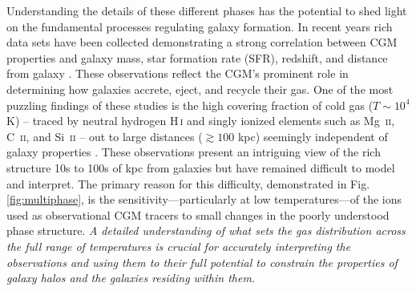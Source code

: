 \documentclass[11pt,letterpaper,english]{article}
\begin{document}
Understanding the details of these different phases has the potential to shed light on the fundamental processes regulating galaxy formation. In recent years rich data sets have been collected demonstrating a strong correlation between CGM properties and galaxy mass, star formation rate (SFR), redshift, and distance from galaxy \cite{Tumlinson+11, Bordoloi+14, Borthakur+15}. These observations reflect the CGM's prominent role in determining how galaxies accrete, eject, and recycle their gas. One of the most puzzling findings of these studies is the high covering fraction of cold gas ($T\sim10^4$ K) -- traced by neutral hydrogen H\,\textsc{i} and singly ionized elements such as Mg\ \textsc{ii}, C\ \textsc{ii}, and Si\ \textsc{ii} -- out to large distances ($\gtrsim 100$ kpc) seemingly independent of galaxy properties \cite{Thom+12}. These observations present an intriguing view of the rich structure 10s to 100s of kpc from galaxies but have remained difficult to model and interpret. 
The primary reason for this difficulty, demonstrated in Fig.\,\ref{fig:multiphase}, 
is the sensitivity---particularly at low temperatures---of the ions used as observational CGM tracers to small changes in the poorly understood phase structure. 
\textit{A detailed understanding of what sets the gas distribution across the full range of temperatures is crucial for accurately interpreting the observations and using them to their full potential to constrain the properties of galaxy halos and the galaxies residing within them.}
\end{document}
